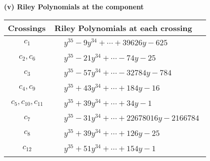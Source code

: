 \documentclass[1p]{elsarticle_modified}
\theoremstyle{definition}
\begin{document}
\newpage\renewcommand{\arraystretch}{1}
\flushleft \textbf{(v) Riley Polynomials at the component}\newline \\
\begin{tabular}{m{50pt}|m{274pt}}
Crossings & \hspace{64pt}Riley Polynomials at each crossing \\
\hline $$\begin{aligned}c_{1}\end{aligned}$$&$\begin{aligned}
&y^{35}-9 y^{34}+\cdots+39626 y-625
\end{aligned}$\\
\hline $$\begin{aligned}c_{2},c_{6}\end{aligned}$$&$\begin{aligned}
&y^{35}-21 y^{34}+\cdots-74 y-25
\end{aligned}$\\
\hline $$\begin{aligned}c_{3}\end{aligned}$$&$\begin{aligned}
&y^{35}-57 y^{34}+\cdots-32784 y-784
\end{aligned}$\\
\hline $$\begin{aligned}c_{4},c_{9}\end{aligned}$$&$\begin{aligned}
&y^{35}+43 y^{34}+\cdots+184 y-16
\end{aligned}$\\
\hline $$\begin{aligned}c_{5},c_{10},c_{11}\end{aligned}$$&$\begin{aligned}
&y^{35}+39 y^{34}+\cdots+34 y-1
\end{aligned}$\\
\hline $$\begin{aligned}c_{7}\end{aligned}$$&$\begin{aligned}
&y^{35}-31 y^{34}+\cdots+22678016 y-2166784
\end{aligned}$\\
\hline $$\begin{aligned}c_{8}\end{aligned}$$&$\begin{aligned}
&y^{35}+39 y^{34}+\cdots+126 y-25
\end{aligned}$\\
\hline $$\begin{aligned}c_{12}\end{aligned}$$&$\begin{aligned}
&y^{35}+51 y^{34}+\cdots+154 y-1
\end{aligned}$\\
\hline
\end{tabular}\\~\\
\end{document}
